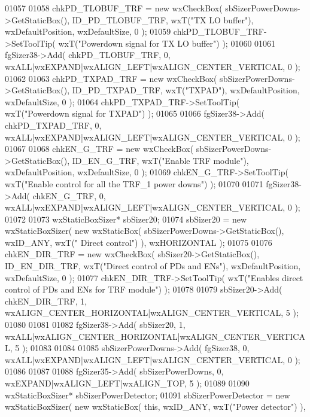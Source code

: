 \begin{DoxyCode}
01057     
01058     chkPD_TLOBUF_TRF = \textcolor{keyword}{new} wxCheckBox( sbSizerPowerDowns->GetStaticBox(), 
      ID_PD_TLOBUF_TRF, wxT(\textcolor{stringliteral}{"TX LO buffer"}), wxDefaultPosition, wxDefaultSize, 0 );
01059     chkPD_TLOBUF_TRF->SetToolTip( wxT(\textcolor{stringliteral}{"Powerdown signal for TX LO buffer"}) );
01060     
01061     fgSizer38->Add( chkPD_TLOBUF_TRF, 0, wxALL|wxEXPAND|wxALIGN\_LEFT|wxALIGN\_CENTER\_VERTICAL, 0 );
01062     
01063     chkPD_TXPAD_TRF = \textcolor{keyword}{new} wxCheckBox( sbSizerPowerDowns->GetStaticBox(), 
      ID_PD_TXPAD_TRF, wxT(\textcolor{stringliteral}{"TXPAD"}), wxDefaultPosition, wxDefaultSize, 0 );
01064     chkPD_TXPAD_TRF->SetToolTip( wxT(\textcolor{stringliteral}{"Powerdown signal for TXPAD"}) );
01065     
01066     fgSizer38->Add( chkPD_TXPAD_TRF, 0, wxALL|wxEXPAND|wxALIGN\_LEFT|wxALIGN\_CENTER\_VERTICAL, 0 );
01067     
01068     chkEN_G_TRF = \textcolor{keyword}{new} wxCheckBox( sbSizerPowerDowns->GetStaticBox(), ID_EN_G_TRF, wxT(\textcolor{stringliteral}{"Enable TRF module"}),
       wxDefaultPosition, wxDefaultSize, 0 );
01069     chkEN_G_TRF->SetToolTip( wxT(\textcolor{stringliteral}{"Enable control for all the TRF\_1 power downs"}) );
01070     
01071     fgSizer38->Add( chkEN_G_TRF, 0, wxALL|wxEXPAND|wxALIGN\_LEFT|wxALIGN\_CENTER\_VERTICAL, 0 );
01072     
01073     wxStaticBoxSizer* sbSizer20;
01074     sbSizer20 = \textcolor{keyword}{new} wxStaticBoxSizer( \textcolor{keyword}{new} wxStaticBox( sbSizerPowerDowns->GetStaticBox(), wxID\_ANY, wxT(\textcolor{stringliteral}{"
      Direct control"}) ), wxHORIZONTAL );
01075     
01076     chkEN_DIR_TRF = \textcolor{keyword}{new} wxCheckBox( sbSizer20->GetStaticBox(), ID_EN_DIR_TRF, wxT(\textcolor{stringliteral}{"Direct control of PDs
       and ENs"}), wxDefaultPosition, wxDefaultSize, 0 );
01077     chkEN_DIR_TRF->SetToolTip( wxT(\textcolor{stringliteral}{"Enables direct control of PDs and ENs for TRF module"}) );
01078     
01079     sbSizer20->Add( chkEN_DIR_TRF, 1, wxALIGN\_CENTER\_HORIZONTAL|wxALIGN\_CENTER\_VERTICAL, 5 );
01080     
01081     
01082     fgSizer38->Add( sbSizer20, 1, wxALL|wxALIGN\_CENTER\_HORIZONTAL|wxALIGN\_CENTER\_VERTICAL, 5 );
01083     
01084     
01085     sbSizerPowerDowns->Add( fgSizer38, 0, wxALL|wxEXPAND|wxALIGN\_LEFT|wxALIGN\_CENTER\_VERTICAL, 0 );
01086     
01087     
01088     fgSizer35->Add( sbSizerPowerDowns, 0, wxEXPAND|wxALIGN\_LEFT|wxALIGN\_TOP, 5 );
01089     
01090     wxStaticBoxSizer* sbSizerPowerDetector;
01091     sbSizerPowerDetector = \textcolor{keyword}{new} wxStaticBoxSizer( \textcolor{keyword}{new} wxStaticBox( \textcolor{keyword}{this}, wxID\_ANY, wxT(\textcolor{stringliteral}{"Power detector"}) ), 

\end{DoxyCode}
